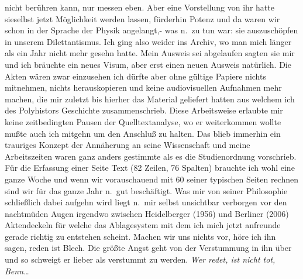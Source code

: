 \documentclass[
]{article}
\begin{document}
nicht berühren kann, nur messen eben. Aber eine Vorstellung von ihr
hatte sieselbst jetzt Möglichkeit werden lassen, fürderhin Potenz und da
waren wir schon in der Sprache der Physik angelangt,- was n.~zu tun war:
sie auszuschöpfen in unserem Dilettantismus. Ich ging also weider ins
Archiv, wo man mich länger als ein Jahr nicht mehr gesehn hatte. Mein
Ausweis sei abgelaufen sagten sie mir und ich bräuchte ein neues Visum,
aber erst einen neuen Ausweis natürlich. Die Akten wären zwar einzusehen
ich dürfte aber ohne gültige Papiere nichts mitnehmen, nichts
herauskopieren und keine audiovisuellen Aufnahmen mehr machen, die mir
zuletzt bis hierher das Material geliefert hatten aus welchem ich des
Polyhistors Geschichte zusammenschrieb. Diese Arbeitsweise erlaubte mir
keine zeitbedingten Pausen der Quelltextanalyse, wo er weiterkommen
wollte mußte auch ich mitgehn um den Anschluß zu halten. Das blieb
immerhin ein trauriges Konzept der Annäherung an seine Wissenschaft und
meine Arbeitszeiten waren ganz anders gestimmte als es die
Studienordnung vorschrieb. Für die Erfassung einer Seite Text (82
Zeilen, 76 Spalten) brauchte ich wohl eine ganze Woche und wenn wir
vorauschauend mit 60 seiner typischen Seiten rechnen sind wir für das
ganze Jahr n.~gut beschäftigt. Was mir von seiner Philosophie
schließlich dabei aufgehn wird liegt n.~mir selbst unsichtbar verborgen
vor den nachtmüden Augen irgendwo zwischen Heidelberger (1956) und
Berliner (2006) Aktendeckeln für welche das Ablagesystem mit dem ich
mich jetzt anfreunde gerade richtig zu entstehen scheint. Machen wir uns
nichts vor, höre ich ihn sagen, reden ist Blech. Die größte Angst geht
von der Verstummung in ihn über und so schweigt er lieber als verstummt
zu werden. \emph{Wer redet, ist nicht tot, Benn\ldots{}}
\end{document}
